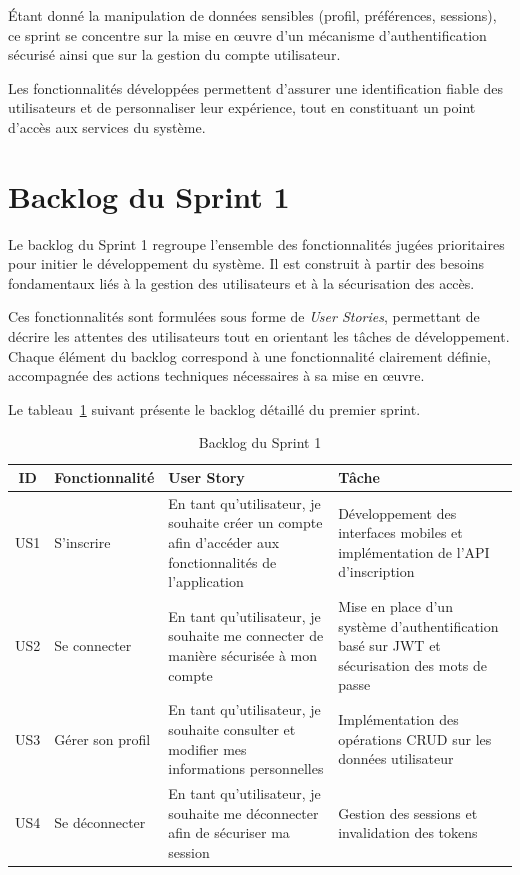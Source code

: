 Étant donné la manipulation de données sensibles (profil, préférences, sessions), ce sprint se concentre sur la mise en œuvre d’un mécanisme d’authentification sécurisé ainsi que sur la gestion du compte utilisateur.

Les fonctionnalités développées permettent d’assurer une identification fiable des utilisateurs et de personnaliser leur expérience, tout en constituant un point d’accès aux services du système.

\section{Backlog du Sprint 1}

Le backlog du Sprint 1 regroupe l’ensemble des fonctionnalités jugées prioritaires pour initier le développement du système. Il est construit à partir des besoins fondamentaux liés à la gestion des utilisateurs et à la sécurisation des accès.

Ces fonctionnalités sont formulées sous forme de \textit{User Stories}, permettant de décrire les attentes des utilisateurs tout en orientant les tâches de développement. Chaque élément du backlog correspond à une fonctionnalité clairement définie, accompagnée des actions techniques nécessaires à sa mise en œuvre.

Le tableau~\ref{tab:backlogs1} suivant présente le backlog détaillé du premier sprint.

\begin{table}[H]
\centering
\renewcommand{\arraystretch}{1.3}
\begin{tabular}{|c|p{3cm}|p{6cm}|p{4cm}|}
\hline
\textbf{ID} & \textbf{Fonctionnalité} & \textbf{User Story} & \textbf{Tâche} \\
\hline

US1 & S'inscrire 
& En tant qu’utilisateur, je souhaite créer un compte afin d’accéder aux fonctionnalités de l’application 
& Développement des interfaces mobiles et implémentation de l’API d’inscription \\ \hline

US2 & Se connecter  
& En tant qu’utilisateur, je souhaite me connecter de manière sécurisée à mon compte 
& Mise en place d’un système d’authentification basé sur JWT et sécurisation des mots de passe \\ \hline

US3 & Gérer son profil 
& En tant qu’utilisateur, je souhaite consulter et modifier mes informations personnelles 
& Implémentation des opérations CRUD sur les données utilisateur \\ \hline

US4 & Se déconnecter  
& En tant qu’utilisateur, je souhaite me déconnecter afin de sécuriser ma session 
& Gestion des sessions et invalidation des tokens \\ \hline

\end{tabular}
\caption{Backlog du Sprint 1}
\label{tab:backlogs1}
\end{table}



